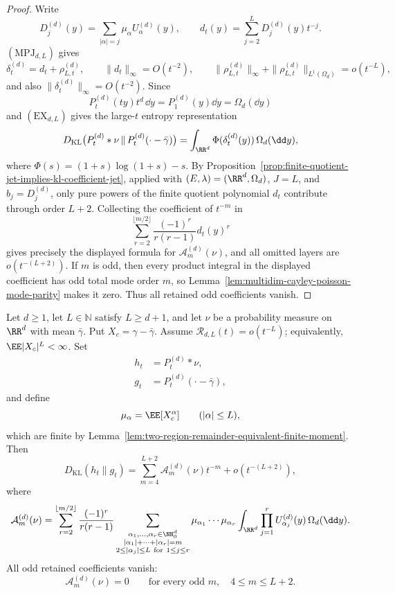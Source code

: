 \begin{proof}
Write
\[
D_j^{(d)}(y)=\sum_{|\alpha|=j}\mu_\alpha U_\alpha^{(d)}(y),\qquad
d_t(y)=\sum_{j=2}^{L}D_j^{(d)}(y)t^{-j}.
\]
\((\mathrm{MPJ}_{d,L})\) gives
\[
\delta_t^{(d)}=d_t+\rho_{L,t}^{(d)},\qquad
\|d_t\|_\infty=O(t^{-2}),\qquad
\|\rho_{L,t}^{(d)}\|_\infty+
\|\rho_{L,t}^{(d)}\|_{L^1(\Omega_d)}=o(t^{-L}),
\]
and also \(\|\delta_t^{(d)}\|_\infty=O(t^{-2})\).  Since
\[
P_t^{(d)}(ty)t^d\,\dd y=P_1^{(d)}(y)\dd y=\Omega_d(\dd y)
\]
and \((\mathrm{EX}_{d,L})\) gives the large-\(t\) entropy representation
\[
D_{\rm KL}\bigl(P_t^{(d)}*\nu\,\|\,P_t^{(d)}(\cdot-\bar{\gamma})\bigr)
=\int_{\RR^d}\Phi(\delta_t^{(d)}(y))\,\Omega_d(\dd y),
\]
where \(\Phi(s)=(1+s)\log(1+s)-s\).
By Proposition~\ref{prop:finite-quotient-jet-implies-kl-coefficient-jet},
applied with \((E,\lambda)=(\RR^d,\Omega_d)\), \(J=L\), and
\(b_j=D_j^{(d)}\), only pure powers of the finite quotient polynomial
\(d_t\) contribute through order \(L+2\).  Collecting the coefficient of
\(t^{-m}\) in
\[
\sum_{r=2}^{\lfloor m/2\rfloor}
\frac{(-1)^r}{r(r-1)}d_t(y)^r
\]
gives precisely the displayed formula for \(\mathcal A_m^{(d)}(\nu)\), and
all omitted layers are \(o(t^{-(L+2)})\).  If \(m\) is odd, then every
product integral in the displayed coefficient has odd total mode order
\(m\), so Lemma~\ref{lem:multidim-cayley-poisson-mode-parity} makes it zero.
Thus all retained odd coefficients vanish.
\end{proof}

\begin{proposition}%
\label{thm:multidim-conditional-tail-poisson-kl-asymptotic}
Let \(d\ge1\), let \(L\in\mathbb N\) satisfy \(L\ge d+1\), and let \(\nu\) be
a probability measure on \(\RR^d\) with mean \(\bar{\gamma}\).  Put
\(X_c=\gamma-\bar{\gamma}\).  Assume
\(\mathcal R_{d,L}(t)=o(t^{-L})\); equivalently,
\(\EE|X_c|^L<\infty\).  Set
\[
\begin{aligned}
h_t&=P_t^{(d)}*\nu,\\
g_t&=P_t^{(d)}(\cdot-\bar{\gamma}),
\end{aligned}
\]
and define
\[
\mu_\alpha=\EE[X_c^\alpha]\qquad(|\alpha|\le L),
\]
which are finite by
Lemma~\ref{lem:two-region-remainder-equivalent-finite-moment}.  Then
\[
D_{\mathrm{KL}}(h_t\|g_t)
=\sum_{m=4}^{L+2}\mathcal A_m^{(d)}(\nu)t^{-m}
+o(t^{-(L+2)}),
\]
where
\[
\mathcal A_m^{(d)}(\nu)=
\sum_{r=2}^{\lfloor m/2\rfloor}
\frac{(-1)^r}{r(r-1)}
\sum_{\substack{\alpha_1,\ldots,\alpha_r\in\NN_0^d\\
|\alpha_1|+\cdots+|\alpha_r|=m\\
2\le|\alpha_j|\le L\ \mathrm{for}\ 1\le j\le r}}
\mu_{\alpha_1}\cdots\mu_{\alpha_r}
\int_{\RR^d}\prod_{j=1}^r
U_{\alpha_j}^{(d)}(y)\,\Omega_d(\dd y).
\]
All odd retained coefficients vanish:
\[
\mathcal A_m^{(d)}(\nu)=0
\qquad\text{for every odd }m,\quad 4\le m\le L+2.
\]
\end{proposition}

